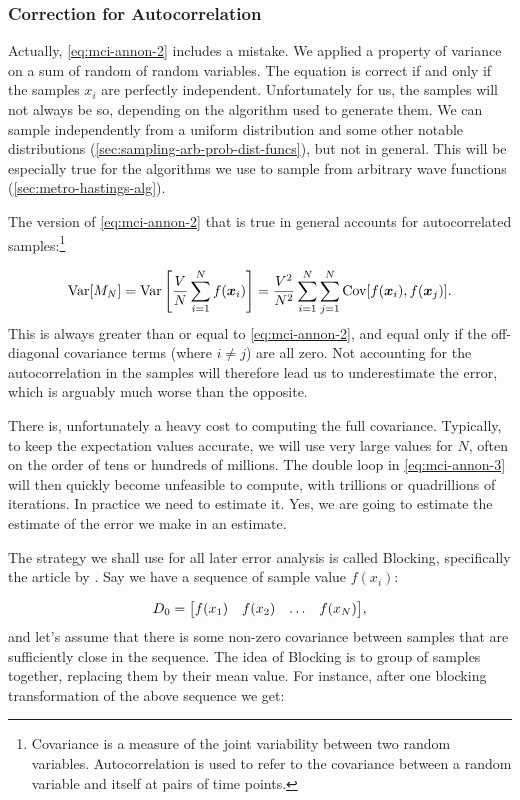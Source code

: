 \documentclass[Thesis.tex]{subfiles}
\begin{document}
\subsubsection{Correction for Autocorrelation}

Actually, \cref{eq:mci-annon-2} includes a mistake. We applied a property of
variance on a sum of random of random variables. The equation is correct if and
only if the samples $x_i$ are perfectly independent. Unfortunately for us,
the samples will not always be so, depending on the algorithm used to generate
them. We can sample independently from a uniform distribution and some other
notable distributions (\cref{sec:sampling-arb-prob-dist-funcs}), but not in
general. This will be especially true for the algorithms we use to sample from
arbitrary wave functions (\cref{sec:metro-hastings-alg}).

The version of \cref{eq:mci-annon-2} that is true in general accounts for
autocorrelated samples:\footnote{Covariance is a measure of the joint
  variability between two random variables. Autocorrelation is used to refer to
  the covariance between a random variable and itself at pairs of time points.}


\begin{align}
  \label{eq:mci-annon-3}
    \operatorname{Var}[M_N] = \operatorname{Var}\qty[ \frac{V}{N} \sum_{i=1}^Nf(\bm{x}_i)] = \frac{V^2}{N^2}\sum_{i=1}^N\sum_{j=1}^N\operatorname{Cov}[f(\bm{x}_i), f(\bm{x}_j)].
\end{align}
This is always greater than or equal to \cref{eq:mci-annon-2}, and equal only if
the off-diagonal covariance terms (where $i\neq j$) are all zero. Not accounting
for the autocorrelation in the samples will therefore lead us to underestimate
the error, which is arguably much worse than the opposite.

There is, unfortunately a heavy cost to computing the full covariance.
Typically, to keep the expectation values accurate, we will use very large
values for $N$, often on the order of tens or hundreds of millions. The double loop in
\cref{eq:mci-annon-3} will then quickly become unfeasible to compute, with
trillions or quadrillions of iterations. In practice we need to estimate it.
Yes, we are going to estimate the estimate of the error we make in an estimate.

The strategy we shall use for all later error analysis is called Blocking,
specifically the article by \textcite{Jonsson-2018}. Say we have a sequence of
sample value $f(x_i)$:

\begin{align}
  D_0 = \mqty[f(x_1) & f(x_2) & \dots & f(x_N)],
\end{align}
and let's assume that there is some non-zero covariance between samples that are
sufficiently close in the sequence. The idea of Blocking is to group
 of samples together, replacing them by their mean value. For
instance, after one blocking transformation of the above sequence we get:
\end{document}
